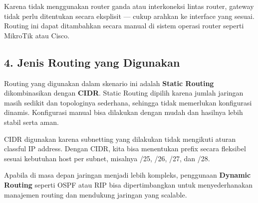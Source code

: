 \documentclass[12pt,a4paper]{article}
\begin{document}
Karena tidak menggunakan router ganda atau interkoneksi lintas router, gateway tidak perlu ditentukan secara eksplisit — cukup arahkan ke interface yang sesuai. Routing ini dapat ditambahkan secara manual di sistem operasi router seperti MikroTik atau Cisco.

\subsection*{4. Jenis Routing yang Digunakan}

Routing yang digunakan dalam skenario ini adalah \textbf{Static Routing} dikombinasikan dengan \textbf{CIDR}. Static Routing dipilih karena jumlah jaringan masih sedikit dan topologinya sederhana, sehingga tidak memerlukan konfigurasi dinamis. Konfigurasi manual bisa dilakukan dengan mudah dan hasilnya lebih stabil serta aman.

CIDR digunakan karena subnetting yang dilakukan tidak mengikuti aturan classful IP address. Dengan CIDR, kita bisa menentukan prefix secara fleksibel sesuai kebutuhan host per subnet, misalnya /25, /26, /27, dan /28.

Apabila di masa depan jaringan menjadi lebih kompleks, penggunaan \textbf{Dynamic Routing} seperti OSPF atau RIP bisa dipertimbangkan untuk menyederhanakan manajemen routing dan mendukung jaringan yang scalable.
\end{document}
